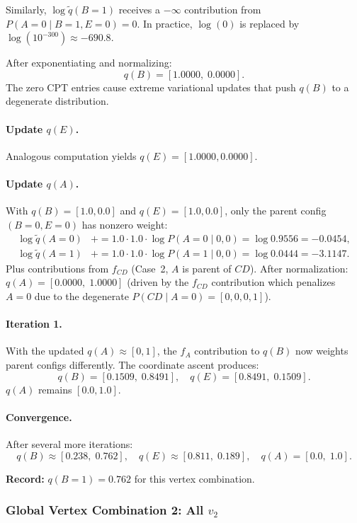 \documentclass[11pt]{article}
\begin{document}
Similarly, $\log \tilde{q}(B{=}1)$ receives a $-\infty$ contribution from
$P(A{=}0 \mid B{=}1, E{=}0) = 0$. In practice, $\log(0)$ is replaced by
$\log(10^{-300}) \approx -690.8$.

After exponentiating and normalizing:
\[
  q(B) = [1.0000,\; 0.0000].
\]
The zero CPT entries cause extreme variational updates that push $q(B)$ to a
degenerate distribution.

\paragraph{Update $q(E)$.} Analogous computation yields $q(E) = [1.0000, 0.0000]$.

\paragraph{Update $q(A)$.}
With $q(B) = [1.0, 0.0]$ and $q(E) = [1.0, 0.0]$, only the parent config $(B{=}0, E{=}0)$ has
nonzero weight:
\begin{align*}
  \log \tilde{q}(A{=}0) &\mathrel{+}= 1.0 \cdot 1.0 \cdot \log P(A{=}0 \mid 0,0) = \log 0.9556 = -0.0454, \\
  \log \tilde{q}(A{=}1) &\mathrel{+}= 1.0 \cdot 1.0 \cdot \log P(A{=}1 \mid 0,0) = \log 0.0444 = -3.1147.
\end{align*}
Plus contributions from $f_{CD}$ (Case~2, $A$ is parent of $CD$).
After normalization: $q(A) = [0.0000,\; 1.0000]$ (driven by the $f_{CD}$ contribution
which penalizes $A{=}0$ due to the degenerate $P(CD \mid A{=}0) = [0,0,0,1]$).

\paragraph{Iteration 1.}
With the updated $q(A) \approx [0, 1]$, the $f_A$ contribution to $q(B)$ now
weights parent configs differently. The coordinate ascent produces:
\[
  q(B) = [0.1509,\; 0.8491], \quad q(E) = [0.8491,\; 0.1509].
\]
$q(A)$ remains $[0.0, 1.0]$.

\paragraph{Convergence.} After several more iterations:
\[
  q(B) \approx [0.238,\; 0.762], \quad q(E) \approx [0.811,\; 0.189], \quad
  q(A) = [0.0,\; 1.0].
\]

\textbf{Record:} $q(B{=}1) = 0.762$ for this vertex combination.

\subsubsection{Global Vertex Combination 2: All $v_2$}
\end{document}
